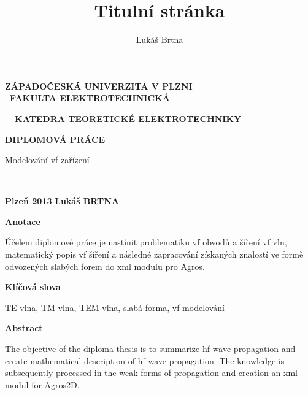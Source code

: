 \documentclass[14pt,a4paper,oneside]{memoir}
\author{Lukáš Brtna}
\title{Titulní stránka}
\begin{document}
\begin{center}
\textbf{ZÁPADOČESKÁ UNIVERZITA V PLZNI\\
~FAKULTA ELEKTROTECHNICKÁ\\
}
\begin{small}
\textbf{~~KATEDRA TEORETICKÉ ELEKTROTECHNIKY}
\end{small}
\vspace{70mm}
\begin{HUGE}
\textbf{DIPLOMOVÁ PRÁCE}
\vspace{8mm}\\
\end{HUGE}
\begin{large}
Modelování vf zařízení
\end{large}
\vspace{90mm}\\
\end{center}
\begin{flushleft}
\textbf{Plzeň 2013}
\hfill
\textbf{Lukáš BRTNA}
\end{flushleft}
\newpage
\begin{large}
\textbf{Anotace \vspace{5mm}\\}
\end{large}
Účelem diplomové práce je nastínit problematiku vf obvodů a šíření vf vln, matematický popis vf šíření a následné zapracování získaných znalostí ve formě odvozených slabých forem do xml modulu pro Agros.
\vspace{100mm}\\
\begin{large}
\textbf{Klíčová slova \vspace{5mm}\\}
\end{large}
TE vlna, TM vlna, TEM vlna, slabá forma, vf modelování
\newpage
\begin{large}
\textbf{Abstract \vspace{5mm}\\}
\end{large}
The objective of the diploma thesis is to summarize hf wave propagation and create mathematical description of hf wave propagation. The knowledge is subsequently processed in the weak forms of propagation and creation an xml modul for Agros2D.
\vspace{100mm}\\
\end{document}
